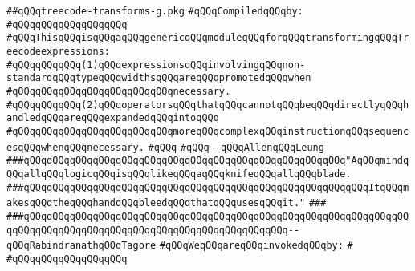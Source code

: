 \label{src/lib/compiler/back/low/treecode/treecode-transforms-g.pkg}
\verb|##qQQqtreecode-transforms-g.pkg|\newline
\newline
\verb|#qQQqCompiledqQQqby:|\newline
\verb|#qQQqqQQqqQQqqQQqqQQq|\newline
\newline
\newline
\newline
\verb|#qQQqThisqQQqisqQQqaqQQqgenericqQQqmoduleqQQqforqQQqtransformingqQQqTreecodeexpressions:|\newline
\verb|#qQQqqQQqqQQq(1)qQQqexpressionsqQQqinvolvingqQQqnon-standardqQQqtypeqQQqwidthsqQQqareqQQqpromotedqQQqwhen|\newline
\verb|#qQQqqQQqqQQqqQQqqQQqqQQqqQQqnecessary.|\newline
\verb|#qQQqqQQqqQQq(2)qQQqoperatorsqQQqthatqQQqcannotqQQqbeqQQqdirectlyqQQqhandledqQQqareqQQqexpandedqQQqintoqQQq|\newline
\verb|#qQQqqQQqqQQqqQQqqQQqqQQqqQQqmoreqQQqcomplexqQQqinstructionqQQqsequencesqQQqwhenqQQqnecessary.|\newline
\verb|#qQQq|\newline
\verb|#qQQq--qQQqAllenqQQqLeung|\newline
\newline
\newline
\newline
\verb|###qQQqqQQqqQQqqQQqqQQqqQQqqQQqqQQqqQQqqQQqqQQqqQQqqQQqqQQq"AqQQqmindqQQqallqQQqlogicqQQqisqQQqlikeqQQqaqQQqknifeqQQqallqQQqblade.|\newline
\verb|###qQQqqQQqqQQqqQQqqQQqqQQqqQQqqQQqqQQqqQQqqQQqqQQqqQQqqQQqqQQqItqQQqmakesqQQqtheqQQqhandqQQqbleedqQQqthatqQQqusesqQQqit."|\newline
\verb|###|\newline
\verb|###qQQqqQQqqQQqqQQqqQQqqQQqqQQqqQQqqQQqqQQqqQQqqQQqqQQqqQQqqQQqqQQqqQQqqQQqqQQqqQQqqQQqqQQqqQQqqQQqqQQqqQQqqQQqqQQqqQQq--qQQqRabindranathqQQqTagore|\newline
\newline
\newline
\verb|#qQQqWeqQQqareqQQqinvokedqQQqby:|\newline
\verb|#|\newline
\verb|#qQQqqQQqqQQqqQQqqQQq|\newline
